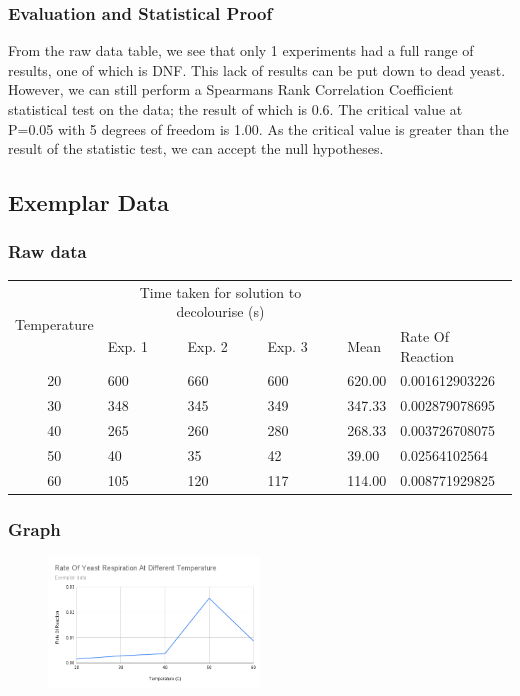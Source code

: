\documentclass{thomasClass}
\begin{document}
\subsubsection{Evaluation and Statistical Proof}
From the raw data table, we see that only 1 experiments had a full range of results, one of which is DNF. This lack of results can be put down to dead yeast. However, we can still perform a Spearmans Rank Correlation Coefficient statistical test on the data; the result of which is 0.6. The critical value at P=0.05 with 5 degrees of freedom is 1.00. As the critical value is greater than the result of the statistic test, we can accept the null hypotheses. \\

\subsection{Exemplar Data}
\subsubsection{Raw data}
\begin{table}[H]
\begin{tabularx}{0.8\textwidth}{c|XXX|XX}
\multicolumn{1}{l}{\multirow{2}{*}{Temperature}} & \multicolumn{3}{c}{Time taken for solution to decolourise (s)} & \multicolumn{1}{l}{} & \multicolumn{1}{l}{} \\
\multicolumn{1}{l}{} & \multicolumn{1}{X}{Exp. 1} & \multicolumn{1}{X}{Exp. 2} & \multicolumn{1}{X}{Exp. 3} & \multicolumn{1}{l}{Mean} & \multicolumn{1}{l}{Rate Of Reaction} \\
\hline
20 & 600 & 660 & 600 & 620.00 & 0.001612903226 \\
30 & 348 & 345 & 349 & 347.33 & 0.002879078695 \\
40 & 265 & 260 & 280 & 268.33 & 0.003726708075 \\
50 & 40 & 35 & 42 & 39.00 & 0.02564102564 \\
60 & 105 & 120 & 117 & 114.00 & 0.008771929825
\end{tabularx}
\end{table}
\subsubsection{Graph}
\begin{figure}[H]
    \centering
    \includegraphics[width=0.5\textwidth]{RPA9-GRAPH2.png}
\end{figure}
\end{document}
